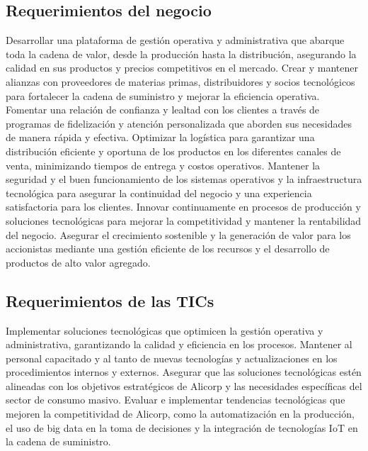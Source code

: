\subsection{Requerimientos del negocio}
    Desarrollar una plataforma de gestión operativa y administrativa que abarque toda la cadena de valor, desde la producción hasta la distribución, asegurando la calidad en sus productos y precios competitivos en el mercado. 
    Crear y mantener alianzas con proveedores de materias primas, distribuidores y socios tecnológicos para fortalecer la cadena de suministro y mejorar la eficiencia operativa. 
    Fomentar una relación de confianza y lealtad con los clientes a través de programas de fidelización y atención personalizada que aborden sus necesidades de manera rápida y efectiva. 
    Optimizar la logística para garantizar una distribución eficiente y oportuna de los productos en los diferentes canales de venta, minimizando tiempos de entrega y costos operativos. 
    Mantener la seguridad y el buen funcionamiento de los sistemas operativos y la infraestructura tecnológica para asegurar la continuidad del negocio y una experiencia satisfactoria para los clientes. 
    Innovar continuamente en procesos de producción y soluciones tecnológicas para mejorar la competitividad y mantener la rentabilidad del negocio. 
    Asegurar el crecimiento sostenible y la generación de valor para los accionistas mediante una gestión eficiente de los recursos y el desarrollo de productos de alto valor agregado. 
\subsection{Requerimientos de las TICs}
    Implementar soluciones tecnológicas que optimicen la gestión operativa y administrativa, garantizando la calidad y eficiencia en los procesos. 
    Mantener al personal capacitado y al tanto de nuevas tecnologías y actualizaciones en los procedimientos internos y externos. 
    Asegurar que las soluciones tecnológicas estén alineadas con los objetivos estratégicos de Alicorp y las necesidades específicas del sector de consumo masivo. 
    Evaluar e implementar tendencias tecnológicas que mejoren la competitividad de Alicorp, como la automatización en la producción, el uso de big data en la toma de decisiones y la integración de tecnologías IoT en la cadena de suministro. 